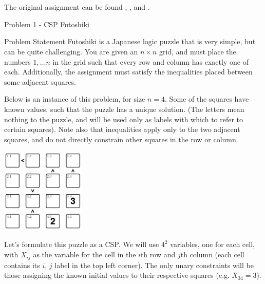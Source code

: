\clearpage

\chapter{\documentName}
\section{\documentName}

\testimonial

The original assignment can be found , , and .

\begin{problem}{Problem 1 - CSP Futoshiki}
    \begin{statement}{Problem Statement}
        Futoshiki is a Japanese logic puzzle that is very simple, but can be quite challenging. You are given an $n \times n$ grid, and must place the numbers $1, \dots n$ in the grid such that every 
        row and column has exactly one of each. Additionally, the assignment must satisfy the inequalities placed between some adjacent squares.

        Below is an instance of this problem, for size $n = 4$. Some of the squares have known values, such that the puzzle has a unique solution. (The letters mean nothing to the puzzle, and will be 
        used only as labels with which to refer to certain squares). Note also that inequalities apply only to the two adjacent squares, and do not directly constrain other squares in the row or column.

        \begin{center}
            \includegraphics[width=0.3\textwidth]{./Images/Futoshiki Square.png}
        \end{center}

        Let's formulate this puzzle as a CSP. We will use $4^{2}$ variables, one for each cell, with $X_{ij}$ as the variable for the cell in the $i$th row and $j$th column (each cell contains its 
        $i$, $j$ label in the top left corner). The only unary constraints will be those assigning the known initial values to their respective squares (e.g. $X_{34} = 3$).


\end{statement}
\end{problem}
